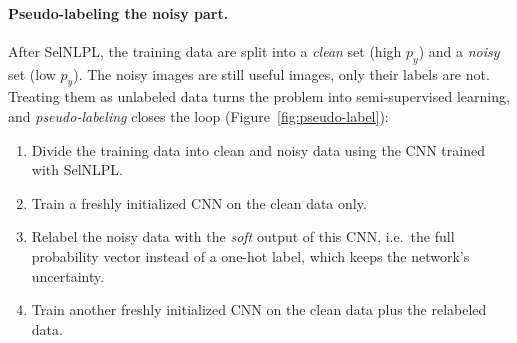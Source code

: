 \paragraph{Pseudo-labeling the noisy part.}
After SelNLPL, the training data are split into a \emph{clean} set (high
$p_y$) and a \emph{noisy} set (low $p_y$). The noisy images are still useful
images, only their labels are not. Treating them as unlabeled data turns the
problem into semi-supervised learning, and \emph{pseudo-labeling} closes the
loop (Figure~\ref{fig:pseudo-label}):
\begin{enumerate}
  \item Divide the training data into clean and noisy data using the CNN
    trained with SelNLPL.
  \item Train a freshly initialized CNN on the clean data only.
  \item Relabel the noisy data with the \emph{soft} output of this CNN, i.e.\
    the full probability vector instead of a one-hot label, which keeps the
    network's uncertainty.
  \item Train another freshly initialized CNN on the clean data plus the
    relabeled data.
\end{enumerate}

